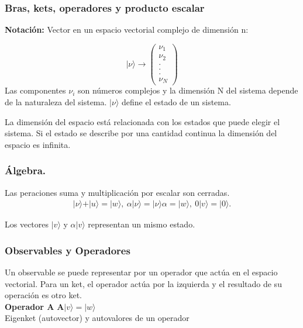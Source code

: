 \documentclass[a4,12pt]{aleph-notas}
\begin{document}
\subsubsection{Bras, kets, operadores y producto escalar}
\textbf{Notación:} Vector en un espacio vectorial complejo de dimensión n:
\begin{multicols}{2}
    \begin{equation*}
        \vert \nu \rangle \rightarrow \begin{pmatrix}
            \nu_1\\ \nu_2\\ .\\.\\.\\\nu_N
        \end{pmatrix}
    \end{equation*}
    Las componentes $\nu_i$ son números complejos y la dimensión N del sistema depende de la naturaleza del sistema. $\vert \nu \rangle $ define el estado de un sistema.
\end{multicols}

La dimensión del espacio está relacionada con los estados que puede elegir el sistema. Si el estado se describe por una cantidad continua la dimensión del espacio es infinita.

\subsubsection{Álgebra.} Las peraciones suma y multiplicación por escalar son cerradas.
\begin{align*}
    \vert \nu \rangle+ \vert u \rangle = \vert w \rangle,  \ \alpha\vert\nu\rangle=\vert\nu\rangle\alpha=\vert w \rangle, \ 0\vert v \rangle = \vert 0 \rangle.
\end{align*}
\begin{advertencia}
    Los vectores $\vert v \rangle$ y $\alpha \vert v \rangle$ representan un mismo estado.
\end{advertencia}

\subsubsection{Observables y Operadores}
Un observable se puede representar por un operador que actúa en el espacio vectorial. Para un ket, el operador actúa por la izquierda y el resultado de su operación es otro ket.\\


\textbf{Operador A} $\mathbf{A} \vert v \rangle=\vert w \rangle$\\
Eigenket (autovector) y autovalores de un operador 
\end{document}
